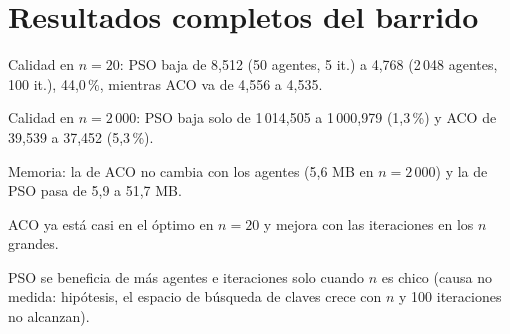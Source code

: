 \appendix
\section{Resultados completos del barrido}
\begin{table}[!htbp]\centering
\caption{ACO vs. PSO, 9 configuraciones por $n$ (media $\pm$ desv. de 3 semillas).}
\label{tab:completa}

{\begin{incisos}\item Calidad en $n=20$: PSO baja de 8,512 (50 agentes, 5 it.) a 4,768 (2\,048 agentes, 100 it.), 44,0\,\%, mientras ACO va de 4,556 a 4,535. \item Calidad en $n=2\,000$: PSO baja solo de 1\,014,505 a 1\,000,979 (1,3\,\%) y ACO de 39,539 a 37,452 (5,3\,\%). \item Memoria: la de ACO no cambia con los agentes (5,6 MB en $n=2\,000$) y la de PSO pasa de 5,9 a 51,7 MB.\end{incisos}}
{\begin{incisos}\item ACO ya está casi en el óptimo en $n=20$ y mejora con las iteraciones en los $n$ grandes. \item PSO se beneficia de más agentes e iteraciones solo cuando $n$ es chico (causa no medida: hipótesis, el espacio de búsqueda de claves crece con $n$ y 100 iteraciones no alcanzan).\end{incisos}}
\end{table}


